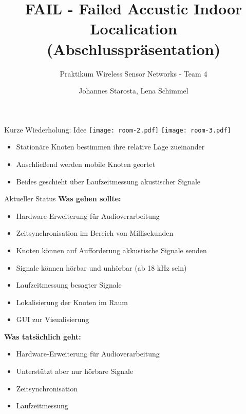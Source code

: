 \documentclass[fleqn,11pt]{beamer}
\title{FAIL - Failed Accustic Indoor  Localication
(Abschlusspräsentation)}
\subtitle{Praktikum Wireless Sensor Networks - Team 4}
\author{Johannes Starosta, Lena Schimmel}
\begin{document}
\begin{frame}[plain]
\titlepage
\end{frame}

\begin{frame}{Kurze Wiederholung: Idee}
	\texttt{[image: room-2.pdf]}
	\texttt{[image: room-3.pdf]}
	\begin{itemize}
		\item Stationäre Knoten bestimmen ihre relative Lage zueinander
		\item Anschließend werden mobile Knoten geortet
		\item Beides geschieht über Laufzeitmessung akustischer Signale
	\end{itemize}
\end{frame}

\begin{frame}{Aktueller Status}
  \textbf{Was gehen sollte:}
	\begin{itemize}
	  \item    Hardware-Erweiterung für Audioverarbeitung
	  \item  Zeitsynchronisation im Bereich von Millisekunden
	  \item   Knoten können auf Aufforderung akkustische Signale senden
	  \item   Signale können hörbar und unhörbar (ab 18 kHz sein)
	  \item   Laufzeitmessung besagter Signale
	  \item   Lokalisierung der Knoten im Raum
	  \item   GUI zur Visualisierung

	\end{itemize}
	
	\textbf{Was tatsächlich geht:}
	\begin{itemize}
	  \item Hardware-Erweiterung für Audioverarbeitung
	  \item   Unterstützt aber nur hörbare Signale
	  \item  Zeitsynchronisation
	  \item   Laufzeitmessung
	\end{itemize}
\end{frame}
\end{document}
